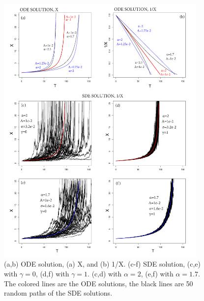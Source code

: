 \documentclass{article}
\begin{document}
\begin{figure}[H]
\centering
\includegraphics[width=0.92\textwidth]{Fig1_plus.png}
\caption{(a,b) ODE solution, (a) X, and (b) 1/X. (c-f) SDE solution, (c,e) with $\gamma=0$, (d,f) with $\gamma=1$. (c,d) with $\alpha=2$, (e,f) with $\alpha=1.7$. The colored lines are the ODE solutions, the black lines are 50 random paths of the SDE solutions.}
\label{Fig1}
\end{figure}
\end{document}
